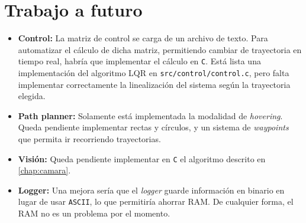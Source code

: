 \documentclass[main]{subfiles}
\begin{document}
\section{Trabajo a futuro}
\label{sec:codigo:trabajo-a-futuro}

\begin{itemize}
\item \textbf{Control:} La matriz de control se carga de un archivo de texto. Para automatizar el cálculo de dicha matriz, permitiendo cambiar de trayectoria en tiempo real, habría que implementar el cálculo en \verb+C+. Está lista una implementación del algoritmo LQR en \verb+src/control/control.c+, pero falta implementar correctamente la linealización del sistema según la trayectoria elegida.
\item \textbf{Path planner:} Solamente está implementada la modalidad de \textit{hovering}. Queda pendiente implementar rectas y círculos, y un sistema de \textit{waypoints} que permita ir recorriendo trayectorias.
\item \textbf{Visión:} Queda pendiente implementar en \verb+C+ el algoritmo descrito en \ref{chap:camara}.
\item \textbf{Logger:} Una mejora sería que el \textit{logger} guarde información en binario en lugar de usar \verb+ASCII+, lo que permitiría ahorrar RAM. De cualquier forma, el RAM no es un problema por el momento.
\end{itemize}
\end{document}
